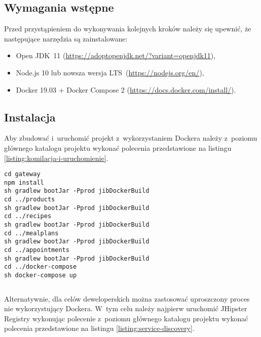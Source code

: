 \subsection{Wymagania wstępne}\label{subsec:prerequirements}
Przed przystąpieniem do wykonywania kolejnych kroków należy się upewnić, że następujące narzędzia są zainstalowane:
\begin{itemize}
    \item Open JDK~11 (\url{https://adoptopenjdk.net/?variant=openjdk11}),
    \item Node.js 10 lub nowsza wersja LTS~(\url{https://nodejs.org/en/}),
    \item Docker 19.03 + Docker Compose 2 (\url{https://docs.docker.com/install/}).
\end{itemize}

\subsection{Instalacja}\label{subsec:installation}

Aby zbudować i~uruchomić projekt z~wykorzystaniem Dockera należy z~poziomu głównego katalogu projektu
wykonać polecenia przedstawione na listingu \ref{listing:komilacja-i-uruchomienie}.

\noindent\hspace{.075\textwidth}\begin{minipage}{.85\textwidth}
    \begin{verbatim}
cd gateway
npm install
sh gradlew bootJar -Pprod jibDockerBuild
cd ../products
sh gradlew bootJar -Pprod jibDockerBuild
cd ../recipes
sh gradlew bootJar -Pprod jibDockerBuild
cd ../mealplans
sh gradlew bootJar -Pprod jibDockerBuild
cd ../appointments
sh gradlew bootJar -Pprod jibDockerBuild
cd ../docker-compose
sh docker-compose up
    \end{verbatim}
    \begin{lstlisting}[caption={Skrypt kompilujący wszystkie mikroserwisy i~uruchamiający aplikację na Dockerze \source{\ownwork}}, label={listing:komilacja-i-uruchomienie}]
\end{lstlisting}
\end{minipage}

Alternatywnie, dla celów deweloperskich można zastosować uproszczony proces nie wykorzystujący Dockera.
W~tym celu należy najpierw uruchomić JHipster Registry wykonując polecenie z~poziomu głównego katalogu projektu
wykonać polecenia przedstawione na listingu \ref{listing:service-discovery}.

